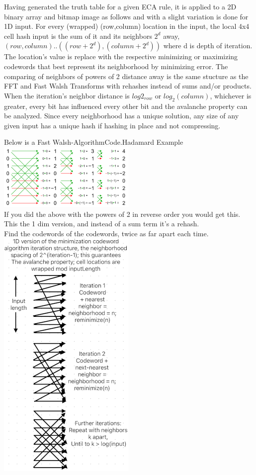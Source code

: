 \documentclass[11pt]{article}
\begin{document}
Having generated the truth table for a given ECA rule, it is applied to a 2D binary array and bitmap image as follows and with a slight variation is done for 1D input. For every (wrapped) (row,column) location in the input, the local 4x4 cell hash input is the sum of it and its neighbors $2^d$ away, $(row,column)..((row+2^d),(column+2^d))$ where d is depth of iteration. The location's value is replace with the respective minimizing or maximizing codewords that best represent its neighborhood by minimizing error. The comparing of neighbors of powers of 2 distance away is the same stucture as the FFT and Fast Walsh Transforms with rehashes instead of sums and/or products. When the iteration's neighbor distance is $log2_{row}$ or $log_2(column)$, whichever is greater, every bit has influenced every other bit and the avalanche property can be analyzed. Since every neighborhood has a unique solution, any size of any given input has a unique hash if hashing in place and not compressing.\\

\begin{center}
Below is a Fast Walsh-AlgorithmCode.Hadamard Example \cite{enwiki:1261916659}\\
\includegraphics{FastWalshHadamard}\\
If you did the above with the powers of 2 in reverse order you would get this. \\
This the 1 dim version, and instead of a sum term it's a rehash.\\ 
Find the codewords of the codewords, twice as far apart each time.\\
\includegraphics{AlgoStruct}\\
\end{center}
\end{document}
